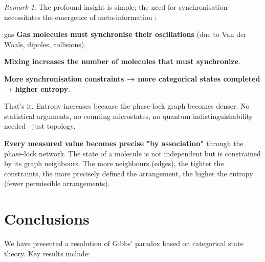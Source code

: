 \documentclass[12pt,a4paper]{article}
\theoremstyle{remark}
\newtheorem{remark}[theorem]{Remark}
\begin{document}
\begin{remark}
The profound insight is simple; the need for synchronisation necessitates the emergence of meta-information :

gas \textbf{Gas molecules must synchronise their oscillations} (due to Van der Waals, dipoles, collisions).

\textbf{Mixing increases the number of molecules that must synchronize}.

\textbf{More synchronisation constraints → more categorical states completed → higher entropy}.

That's it. Entropy increases because the phase-lock graph becomes denser. No statistical arguments, no counting microstates, no quantum indistinguishability needed—just topology.

\textbf{Every measured value becomes precise "by association"} through the phase-lock network. The state of a molecule is not independent but is constrained by its graph neighbours. The more neighbours (edges), the tighter the constraints, the more precisely defined the arrangement, the higher the entropy (fewer permissible arrangements).
\end{remark}

\section{Conclusions}

We have presented a resolution of Gibbs' paradox based on categorical state theory. Key results include:
\end{document}
